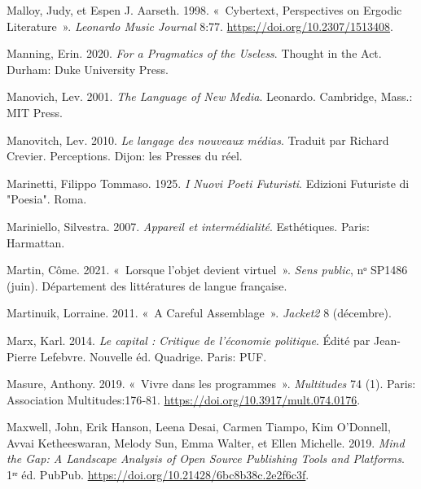 \begin{CSLReferences}{1}{0}
\leavevmode{}%
Malloy, Judy, et Espen J. Aarseth. 1998. {«~Cybertext, {Perspectives} on
{Ergodic Literature}~»}. \emph{Leonardo Music Journal} 8:77.
\url{https://doi.org/10.2307/1513408}.

\leavevmode{}%
Manning, Erin. 2020. \emph{For a {Pragmatics} of the {Useless}}. Thought
in the Act. {Durham}: {Duke University Press}.

\leavevmode{}%
Manovich, Lev. 2001. \emph{The {Language} of {New Media}}. Leonardo.
{Cambridge, Mass.}: {MIT Press}.

\leavevmode{}%
Manovitch, Lev. 2010. \emph{{Le langage des nouveaux m{é}dias}}. Traduit
par Richard Crevier. {Perceptions}. {Dijon}: {les Presses du r{é}el}.

\leavevmode{}%
Marinetti, Filippo Tommaso. 1925. \emph{I Nuovi Poeti Futuristi}.
Edizioni Futuriste di "Poesia". {Roma}.

\leavevmode{}%
Mariniello, Silvestra. 2007. \emph{{Appareil et interm{é}dialit{é}}}.
{Esth{é}tiques}. {Paris}: {Harmattan}.

\leavevmode{}%
Martin, Côme. 2021. {«~{Lorsque l'objet devient virtuel}~»}. \emph{Sens
public}, nᵒ SP1486 (juin). {D{é}partement des litt{é}ratures de langue
fran{ç}aise}.

\leavevmode{}%
Martinuik, Lorraine. 2011. {«~A {Careful Assemblage}~»}. \emph{Jacket2}
8 (décembre).

\leavevmode{}%
Marx, Karl. 2014. \emph{{Le capital : Critique de l'{é}conomie
politique}}. Édité par Jean-Pierre Lefebvre. Nouvelle {é}d. {Quadrige}.
{Paris}: {PUF}.

\leavevmode{}%
Masure, Anthony. 2019. {«~{Vivre dans les programmes}~»}.
\emph{Multitudes} 74 (1). {Paris}: {Association Multitudes}:176‑81.
\url{https://doi.org/10.3917/mult.074.0176}.

\leavevmode{}%
Maxwell, John, Erik Hanson, Leena Desai, Carmen Tiampo, Kim O'Donnell,
Avvai Ketheeswaran, Melody Sun, Emma Walter, et Ellen Michelle. 2019.
\emph{Mind the {Gap}: {A Landscape Analysis} of {Open Source Publishing
Tools} and {Platforms}}. 1ʳᵉ éd. {PubPub}.
\url{https://doi.org/10.21428/6bc8b38c.2e2f6c3f}.


\end{CSLReferences}
